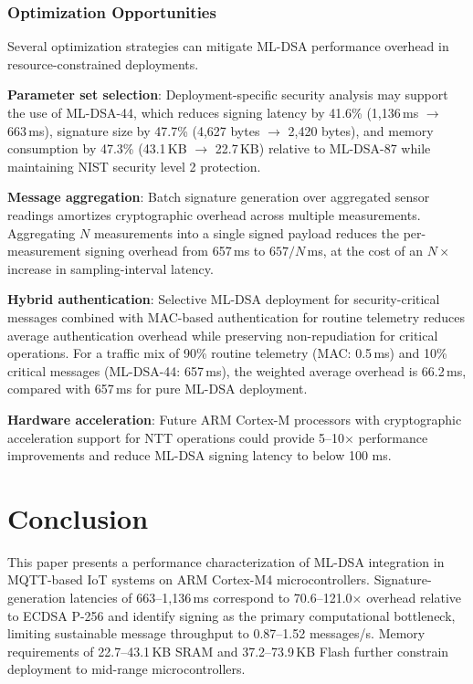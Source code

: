 \documentclass[final, twoside]{IEEEtran} %
\begin{document}
\subsubsection{Optimization Opportunities}

Several optimization strategies can mitigate ML-DSA performance overhead in resource-constrained deployments.

\textbf{Parameter set selection}: Deployment-specific security analysis may support the use of ML-DSA-44, which reduces signing latency by 41.6\% (1,136\,ms $\rightarrow$ 663\,ms), signature size by 47.7\% (4,627 bytes $\rightarrow$ 2,420 bytes), and memory consumption by 47.3\% (43.1\,KB $\rightarrow$ 22.7\,KB) relative to ML-DSA-87 while maintaining NIST security level 2 protection.

\textbf{Message aggregation}: Batch signature generation over aggregated sensor readings amortizes cryptographic overhead across multiple measurements. Aggregating $N$ measurements into a single signed payload reduces the per-measurement signing overhead from 657\,ms to $657/N$\,ms, at the cost of an $N\times$ increase in sampling-interval latency.

\textbf{Hybrid authentication}: Selective ML-DSA deployment for security-critical messages combined with MAC-based authentication for routine telemetry reduces average authentication overhead while preserving non-repudiation for critical operations. For a traffic mix of 90\% routine telemetry (MAC: 0.5\,ms) and 10\% critical messages (ML-DSA-44: 657\,ms), the weighted average overhead is 66.2\,ms, compared with 657\,ms for pure ML-DSA deployment.

\textbf{Hardware acceleration}: Future ARM Cortex-M processors with cryptographic acceleration support for NTT operations could provide 5--10$\times$ performance improvements and reduce ML-DSA signing latency to below 100 ms.

\section{Conclusion}\label{sec:conclusion}

This paper presents a performance characterization of ML-DSA integration in MQTT-based IoT systems on ARM Cortex-M4 microcontrollers. Signature-generation latencies of 663--1,136\,ms correspond to 70.6--121.0$\times$ overhead relative to ECDSA P-256 and identify signing as the primary computational bottleneck, limiting sustainable message throughput to 0.87--1.52 messages/s. Memory requirements of 22.7--43.1\,KB SRAM and 37.2--73.9\,KB Flash further constrain deployment to mid-range microcontrollers.
\end{document}
